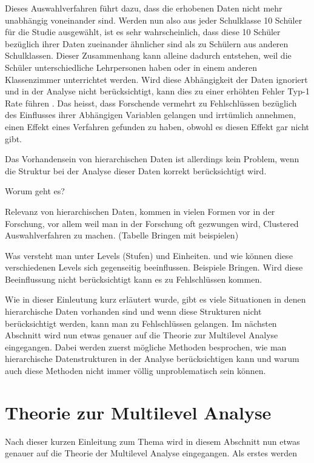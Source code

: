 \documentclass[12pt]{article}\usepackage[]{graphicx}\usepackage[]{color}
\begin{document}
Dieses Auswahlverfahren führt dazu, dass die erhobenen Daten nicht mehr unabhängig voneinander sind. Werden nun also aus jeder Schulklasse 10 Schüler für die Studie ausgewählt, ist es sehr wahrscheinlich, dass diese 10 Schüler bezüglich ihrer Daten zueinander ähnlicher sind als zu Schülern aus anderen Schulklassen. Dieser Zusammenhang kann alleine dadurch entstehen, weil die Schüler unterschiedliche Lehrpersonen haben oder in einem anderen Klassenzimmer unterrichtet werden. Wird diese Abhängigkeit der Daten ignoriert und in der Analyse nicht berücksichtigt, kann dies zu einer erhöhten Fehler Typ-1 Rate führen \citep{dorman2008effect, mcneish2014analyzing}. Das heisst, dass Forschende vermehrt zu Fehlschlüssen bezüglich des Einflusses ihrer Abhängigen Variablen gelangen und irrtümlich annehmen, einen Effekt eines Verfahren gefunden zu haben, obwohl es diesen Effekt gar nicht gibt.

Das Vorhandensein von hierarchischen Daten ist allerdings kein Problem, wenn die Struktur bei der Analyse dieser Daten korrekt berücksichtigt wird. 

Worum geht es?

Relevanz von hierarchischen Daten, kommen in vielen Formen vor in der Forschung, vor allem weil man in der Forschung oft gezwungen wird, Clustered Auswahlverfahren zu machen. (Tabelle Bringen mit beispielen)

Was versteht man unter Levels (Stufen) und Einheiten. und wie können diese verschiedenen Levels sich gegenseitig beeinflussen. Beispiele Bringen. 
Wird diese Beeinflussung nicht berücksichtigt kann es zu Fehlschlüssen kommen.

Wie in dieser Einleutung kurz erläutert wurde, gibt es viele Situationen in denen hierarchische Daten vorhanden sind und wenn diese Strukturen nicht berücksichtigt werden, kann man zu Fehlschlüssen gelangen. Im nächsten Abschnitt wird nun etwas genauer auf die Theorie zur Multilevel Analyse eingegangen. Dabei werden zuerst mögliche Methoden besprochen, wie man hierarchische Datenstrukturen in der Analyse berücksichtigen kann und warum auch diese Methoden nicht immer völlig unproblematisch sein können. 

\section{Theorie zur Multilevel Analyse}
Nach dieser kurzen Einleitung zum Thema wird in diesem Abschnitt nun etwas genauer auf die Theorie der Multilevel Analyse eingegangen. Als erstes werden 
\end{document}
